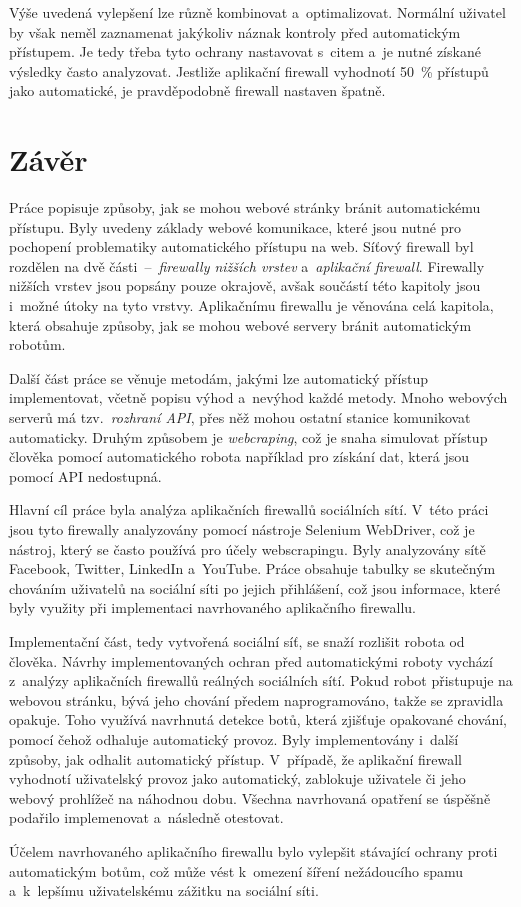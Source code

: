 Výše uvedená vylepšení lze různě kombinovat a~optimalizovat. Normální uživatel by však neměl zaznamenat jakýkoliv náznak kontroly před automatickým přístupem. Je tedy třeba tyto ochrany nastavovat s~citem a~je nutné získané výsledky často analyzovat. Jestliže aplikační firewall vyhodnotí 50~\% přístupů jako automatické, je pravděpodobně firewall nastaven špatně.

\chapter{Závěr}
Práce popisuje způsoby, jak se mohou webové stránky bránit automatickému přístupu. Byly uvedeny základy webové komunikace, které jsou nutné pro pochopení problematiky automatického přístupu na web. Síťový firewall byl rozdělen na dvě části~--~\textit{firewally nižších vrstev} a~\textit{aplikační firewall}. Firewally nižších vrstev jsou popsány pouze okrajově, avšak součástí této kapitoly jsou i~možné útoky na tyto vrstvy. Aplikačnímu firewallu je věnována celá kapitola, která obsahuje způsoby, jak se mohou webové servery bránit automatickým robotům.

Další část práce se věnuje metodám, jakými lze automatický přístup implementovat, včetně popisu výhod a~nevýhod každé metody. Mnoho webových serverů má tzv.~\textit{rozhraní API}, přes něž mohou ostatní stanice komunikovat automaticky. Druhým způsobem je \textit{webcraping}, což je snaha simulovat přístup člověka pomocí automatického robota například pro získání dat, která jsou pomocí API nedostupná.

Hlavní cíl práce byla analýza aplikačních firewallů sociálních sítí. V~této práci jsou tyto firewally analyzovány pomocí nástroje Selenium WebDriver, což je nástroj, který se často používá pro účely webscrapingu. Byly analyzovány sítě Facebook, Twitter, LinkedIn a~YouTube. Práce obsahuje tabulky se skutečným chováním uživatelů na sociální síti po jejich přihlášení, což jsou informace, které byly využity při implementaci navrhovaného aplikačního firewallu.

Implementační část, tedy vytvořená sociální síť, se snaží rozlišit robota od člověka. Návrhy implementovaných ochran před automatickými roboty vychází z~analýzy aplikačních firewallů reálných sociálních sítí. Pokud robot přistupuje na webovou stránku, bývá jeho chování předem naprogramováno, takže se zpravidla opakuje. Toho využívá navrhnutá detekce botů, která zjišťuje opakované chování, pomocí čehož odhaluje automatický provoz. Byly implementovány i~další způsoby, jak odhalit automatický přístup. V~případě, že aplikační firewall vyhodnotí uživatelský provoz jako automatický, zablokuje uživatele či jeho webový prohlížeč na náhodnou dobu. Všechna navrhovaná opatření se úspěšně podařilo implemenovat a~následně otestovat.

Účelem navrhovaného aplikačního firewallu bylo vylepšit stávající ochrany proti automatickým botům, což může vést k~omezení šíření nežádoucího spamu a~k~lepšímu uživatelskému zážitku na sociální síti.
